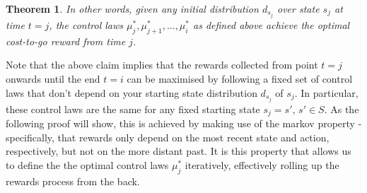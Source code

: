 \documentclass[11pt]{article} %
\newtheorem{thm}{Theorem}
\begin{document}
\begin{thm}
In other words, given any initial distribution $d_{s_j}$ over state $s_j$ at time $t=j$, the control laws $\mu_j^*,\mu_{j+1}^*,\dots,\mu_i^*$ as defined above achieve the optimal cost-to-go reward from time $j$.

\end{thm}

Note that the above claim implies that the rewards collected from point $t=j$ onwards until the end $t=i$ can be maximised by following a fixed set of control laws that don't depend on your starting state distribution $d_{s_j}$ of $s_j$. In particular, these control laws are the same for any fixed starting state $s_j = s'$, $s' \in S$. As the following proof will show, this is achieved by making use of the markov property - specifically, that rewards only depend on the most recent state and action, respectively, but not on the more distant past. It is this property that allows us to define the the optimal control laws $\mu_j^*$ iteratively, effectively rolling up the rewards process from the back.
\end{document}
